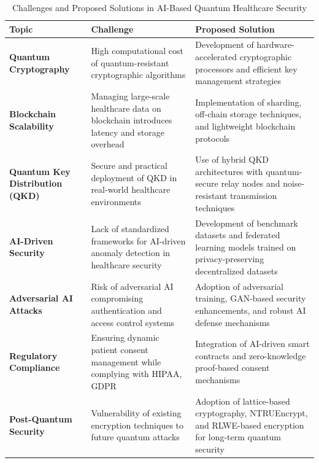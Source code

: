 \documentclass[pdflatex,sn-mathphys-num]{sn-jnl}
\theoremstyle{thmstyleone}%
\theoremstyle{thmstyletwo}%
\theoremstyle{thmstylethree}%
\begin{document}
\begin{table}[h!]
    \centering
    \caption{Challenges and Proposed Solutions in AI-Based Quantum Healthcare Security}
    \label{tab:challenges_solutions}
    \begin{tabular}{|p{2cm}|p{4.8cm}|p{4.8cm}|}
        \hline
        \textbf{Topic} & \textbf{Challenge} & \textbf{Proposed Solution} \\
        \hline
        \textbf{Quantum Cryptography} & High computational cost of quantum-resistant cryptographic algorithms & Development of hardware-accelerated cryptographic processors and efficient key management strategies \\
        \hline
        \textbf{Blockchain Scalability} & Managing large-scale healthcare data on blockchain introduces latency and storage overhead & Implementation of sharding, off-chain storage techniques, and lightweight blockchain protocols \\
        \hline
        \textbf{Quantum Key Distribution (QKD)} & Secure and practical deployment of QKD in real-world healthcare environments & Use of hybrid QKD architectures with quantum-secure relay nodes and noise-resistant transmission techniques \\
        \hline
        \textbf{AI-Driven Security} & Lack of standardized frameworks for AI-driven anomaly detection in healthcare security & Development of benchmark datasets and federated learning models trained on privacy-preserving decentralized datasets \\
        \hline
        \textbf{Adversarial AI Attacks} & Risk of adversarial AI compromising authentication and access control systems & Adoption of adversarial training, GAN-based security enhancements, and robust AI defense mechanisms \\
        \hline
        \textbf{Regulatory Compliance} & Ensuring dynamic patient consent management while complying with HIPAA, GDPR & Integration of AI-driven smart contracts and zero-knowledge proof-based consent mechanisms \\
        \hline
        \textbf{Post-Quantum Security} & Vulnerability of existing encryption techniques to future quantum attacks & Adoption of lattice-based cryptography, NTRUEncrypt, and RLWE-based encryption for long-term quantum security \\
        \hline
    \end{tabular}
\end{table}

\end{document}
